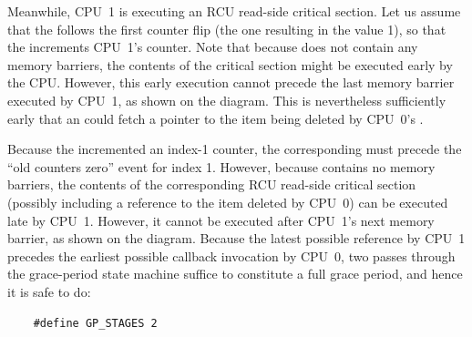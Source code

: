 Meanwhile, CPU~1 is executing an RCU read-side critical section.
Let us assume that the  follows the first
counter flip (the one resulting in the value 1), so that the
 increments CPU~1's
 counter.
Note that because  does not contain any
memory barriers, the contents of the critical section might be executed
early by the CPU.
However, this early execution cannot precede the last memory barrier
executed by CPU~1, as shown on the diagram.
This is nevertheless sufficiently early that an 
could fetch a pointer to the item being deleted by CPU~0's
.

Because the  incremented an index-1 counter,
the corresponding  must
precede the ``old counters zero'' event for index 1.
However, because  contains no memory
barriers, the contents of the corresponding RCU read-side critical
section (possibly including a reference to the item deleted by
CPU~0) can be executed late by CPU~1.
However, it cannot be executed after CPU~1's next memory barrier,
as shown on the diagram.
Because the latest possible reference by CPU~1 precedes the
earliest possible callback invocation by CPU~0, two passes
through the grace-period state machine suffice to constitute
a full grace period, and hence it is safe to do:

\vspace{5pt}
\begin{minipage}[t]{\columnwidth}
\small
\begin{verbatim}
    #define GP_STAGES 2
\end{verbatim}
\end{minipage}
\vspace{5pt}

